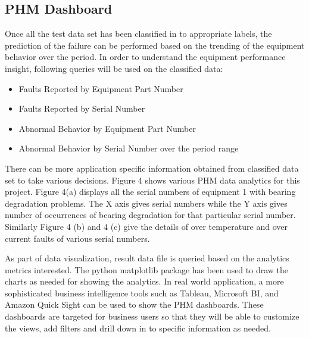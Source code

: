 \documentclass[sigconf]{acmart}
\begin{document}
\subsection{PHM Dashboard}
Once all the test data set has been classified in to appropriate labels, the prediction of the failure can be performed based on the trending of the equipment behavior over the period. In order to understand the equipment performance insight, following queries will be used on the classified data:
\begin{itemize}
  \item Faults Reported by Equipment Part Number
  \item Faults Reported by Serial Number
  \item Abnormal Behavior by Equipment Part Number
  \item Abnormal Behavior by Serial Number over the period range
\end{itemize}
There can be more application specific information obtained from classified data set to take various decisions. Figure 4 shows various PHM data analytics for this project. Figure 4(a) displays all the serial numbers of equipment 1 with bearing degradation problems. The X axis gives serial numbers while the Y axis gives number of occurrences of bearing degradation for that particular serial number. Similarly Figure 4 (b) and 4 (c) give the details of over temperature and over current faults of various serial numbers.

As part of data visualization, result data file is queried based on the analytics metrics interested. The python matplotlib package has been used to draw the charts as needed for showing the analytics. In real world application, a more sophisticated business intelligence tools such as Tableau, Microsoft BI, and Amazon Quick Sight can be used to show the PHM dashboards. These dashboards are targeted for business users so that they will be able to customize the views, add filters and drill down in to specific information as needed. 
\end{document}
